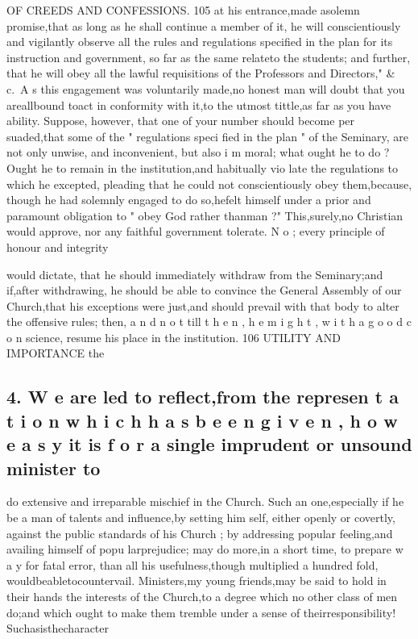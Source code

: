 \documentclass[
]{book}
\begin{document}
OF CREEDS AND CONFESSIONS. 105
at his entrance,made asolemn promise,that as long as he shall continue a member of it, he will conscientiously and vigilantly observe all the rules and regulations specified in the plan for its instruction and government, so far as the same relateto the students; and further, that he will obey all the lawful requisitions of the Professors and Directors," \& c.~A s this
engagement was voluntarily made,no honest man will doubt that you areallbound toact
in conformity with it,to the utmost tittle,as far as you have ability. Suppose, however, that one of your number should become per suaded,that some of the " regulations speci fied in the plan " of the Seminary, are not only unwise, and inconvenient, but also i m moral; what ought he to do ? Ought he to remain in the institution,and habitually vio late the regulations to which he excepted,
pleading that he could not conscientiously obey them,because, though he had solemnly engaged to do so,hefelt himself under a prior and paramount obligation to " obey God rather thanman ?" This,surely,no Christian would approve, nor any faithful government tolerate. N o ; every principle of honour and integrity

would dictate, that he should immediately withdraw from the Seminary;and if,after withdrawing, he should be able to convince the General Assembly of our Church,that his exceptions were just,and should prevail with that body to alter the offensive rules; then, a n d n o t till t h e n , h e m i g h t , w i t h a g o o d c o n
science, resume his place in the institution.
106 UTILITY AND IMPORTANCE
the

\hypertarget{w-e-are-led-to-reflectfrom-the-represen-t-a-t-i-o-n-w-h-i-c-h-h-a-s-b-e-e-n-g-i-v-e-n-h-o-w-e-a-s-y-it-is-f-o-r-a-single-imprudent-or-unsound-minister-to}{%
\subsection{4. W e are led to reflect,from the represen t a t i o n w h i c h h a s b e e n g i v e n , h o w e a s y it is f o r a single imprudent or unsound minister to}\label{w-e-are-led-to-reflectfrom-the-represen-t-a-t-i-o-n-w-h-i-c-h-h-a-s-b-e-e-n-g-i-v-e-n-h-o-w-e-a-s-y-it-is-f-o-r-a-single-imprudent-or-unsound-minister-to}}

do extensive and irreparable mischief in the Church. Such an one,especially if he be a man of talents and influence,by setting him self, either openly or covertly, against the public standards of his Church ; by addressing popular feeling,and availing himself of popu larprejudice; may do more,in a short time, to prepare w a y for fatal error, than all his usefulness,though multiplied a hundred fold, wouldbeabletocountervail. Ministers,my young friends,may be said to hold in their
hands the interests of the Church,to a degree which no other class of men do;and which ought to make them tremble under a sense of theirresponsibility! Suchasisthecharacter
\end{document}
